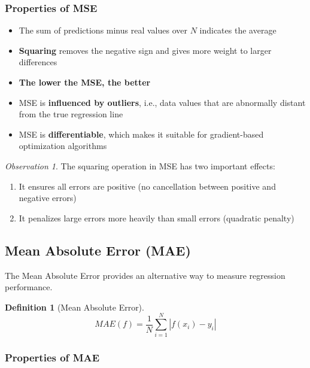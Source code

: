 \documentclass[11pt,a4paper]{article}
\theoremstyle{definition}
\newtheorem{definition}{Definition}[section]
\theoremstyle{plain}
\theoremstyle{remark}
\newtheorem*{observation}{Observation}
\begin{document}
\subsubsection{Properties of MSE}

\begin{itemize}
    \item The sum of predictions minus real values over $N$ indicates the average
    \item \textbf{Squaring} removes the negative sign and gives more weight to larger differences
    \item \textbf{The lower the MSE, the better}
    \item MSE is \textbf{influenced by outliers}, i.e., data values that are abnormally distant from the true regression line
    \item MSE is \textbf{differentiable}, which makes it suitable for gradient-based optimization algorithms
\end{itemize}

\begin{observation}
The squaring operation in MSE has two important effects:
\begin{enumerate}
    \item It ensures all errors are positive (no cancellation between positive and negative errors)
    \item It penalizes large errors more heavily than small errors (quadratic penalty)
\end{enumerate}
\end{observation}

\subsection{Mean Absolute Error (MAE)}

The Mean Absolute Error provides an alternative way to measure regression performance.

\begin{definition}[Mean Absolute Error]
\begin{equation}
MAE(f) = \frac{1}{N} \sum_{i=1}^{N} |f(x_i) - y_i|
\end{equation}
\end{definition}

\subsubsection{Properties of MAE}
\end{document}
